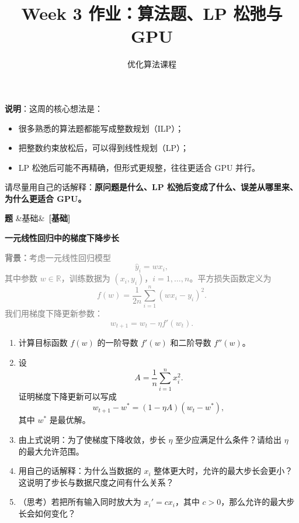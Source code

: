 \documentclass[12pt, a4paper]{article}
\title{\textbf{Week 3 作业：算法题、LP 松弛与 GPU}}
\author{优化算法课程}
\date{}
\newcounter{probcnt}
\newenvironment{problem}[1][]{%
  \stepcounter{probcnt}
  \begin{mdframed}[linecolor=black!30, backgroundcolor=gray!4,
    innertopmargin=8pt, innerbottommargin=8pt,
    innerleftmargin=10pt, innerrightmargin=10pt,
    skipabove=10pt, skipbelow=4pt]
  \noindent\textbf{题 \theprobcnt}\ifx&#1&\else\ \textbf{[#1]}\fi\quad
}{%
  \end{mdframed}
}
\newenvironment{subproblems}{%
  \begin{enumerate}[label=(\alph*), leftmargin=1.8em, topsep=4pt, itemsep=4pt]
}{%
  \end{enumerate}
}
\newcommand{\context}[1]{\smallskip\noindent\textcolor{gray}{\small \textbf{背景：}#1}\smallskip}
\newcommand{\R}{\mathbb{R}}
\begin{document}
\maketitle
\thispagestyle{empty}

\noindent\textbf{说明}：这周的核心想法是：
\begin{itemize}[leftmargin=1.8em]
    \item 很多熟悉的算法题都能写成整数规划（ILP）；
    \item 把整数约束放松后，可以得到线性规划（LP）；
    \item LP 松弛后可能不再精确，但形式更规整，往往更适合 GPU 并行。
\end{itemize}

\noindent 请尽量用自己的话解释：\textbf{原问题是什么、LP 松弛后变成了什么、误差从哪里来、为什么更适合 GPU。}



\bigskip

\begin{problem}[基础]
\textbf{一元线性回归中的梯度下降步长}

\context{考虑一元线性回归模型
$$
\hat y_i = wx_i,
$$
其中参数 $w\in\R$，训练数据为 $(x_i,y_i)$，$i=1,\dots,n$。平方损失函数定义为
$$
f(w)=\frac{1}{2n}\sum_{i=1}^n (wx_i-y_i)^2.
$$
我们用梯度下降更新参数：
$$
w_{t+1}=w_t-\eta f'(w_t).
$$}

\begin{subproblems}
    \item 计算目标函数 $f(w)$ 的一阶导数 $f'(w)$ 和二阶导数 $f''(w)$。
    
    \item 设
    $$
    A=\frac{1}{n}\sum_{i=1}^n x_i^2.
    $$
    证明梯度下降更新可以写成
    $$
    w_{t+1}-w^\ast = (1-\eta A)(w_t-w^\ast),
    $$
    其中 $w^\ast$ 是最优解。
    
    \item 由上式说明：为了使梯度下降收敛，步长 $\eta$ 至少应满足什么条件？请给出 $\eta$ 的最大允许范围。
    
    \item 用自己的话解释：为什么当数据的 $x_i$ 整体更大时，允许的最大步长会更小？这说明了步长与数据尺度之间有什么关系？
    
    \item （思考）若把所有输入同时放大为 $x_i' = c x_i$，其中 $c>0$，那么允许的最大步长会如何变化？
\end{subproblems}
\end{problem}
\end{document}
